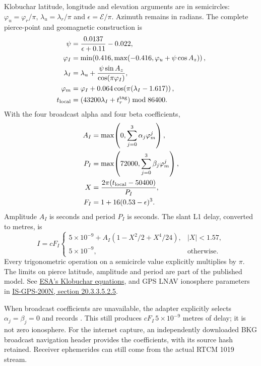 Klobuchar latitude, longitude and elevation arguments are in semicircles:
$\varphi_u=\varphi_r/\pi$, $\lambda_u=\lambda_r/\pi$ and
$\epsilon=\mathcal E/\pi$. Azimuth remains in radians. The complete pierce-point
and geomagnetic construction is
\begin{align}
 \psi&=\frac{0.0137}{\epsilon+0.11}-0.022,\\
 \varphi_I&=\min\!\left(0.416,
       \max\!\left(-0.416,\varphi_u+\psi\cos A_z\right)\right),\\
 \lambda_I&=\lambda_u+\frac{\psi\sin A_z}{\cos(\pi\varphi_I)},\\
 \varphi_m&=\varphi_I+0.064\cos\!\left(\pi(\lambda_I-1.617)\right),\\
 t_{\rm local}&=(43200\lambda_I+t_r^{\rm tag})\bmod86400.
\end{align}
With the four broadcast alpha and four beta coefficients,
\begin{align}
 A_I&=\max\!\left(0,\sum_{j=0}^{3}\alpha_j\varphi_m^j\right),\\
 P_I&=\max\!\left(72000,\sum_{j=0}^{3}\beta_j\varphi_m^j\right),\\
 X&=\frac{2\pi(t_{\rm local}-50400)}{P_I},\\
 F_I&=1+16(0.53-\epsilon)^3.
\end{align}
Amplitude $A_I$ is seconds and period $P_I$ is seconds. The slant L1 delay,
converted to metres, is
\begin{equation}
 I=cF_I
 \begin{cases}
 5\times10^{-9}+A_I\left(1-X^2/2+X^4/24\right),&|X|<1.57,\\
 5\times10^{-9},&\text{otherwise}.
 \end{cases}
 \label{eq:live-klobuchar}
\end{equation}
Every trigonometric operation on a semicircle value explicitly multiplies by
$\pi$. The limits on pierce latitude, amplitude and period are part of the
published model. See
\href{https://gssc.esa.int/navipedia/index.php/Klobuchar_Ionospheric_Model}{ESA's
Klobuchar equations}, and GPS LNAV ionosphere parameters in
\href{https://www.gps.gov/sites/default/files/2025-07/IS-GPS-200N.pdf}{IS-GPS-200N,
section 20.3.3.5.2.5}.

When broadcast coefficients are unavailable, the adapter explicitly selects
$\alpha_j=\beta_j=0$ and records
. This still produces
$cF_I\,5\times10^{-9}$ metres of delay; it is not zero ionosphere. For the
internet capture, an independently downloaded BKG broadcast navigation header
provides the coefficients, with its source hash retained. Receiver ephemerides
can still come from the actual RTCM 1019 stream.

